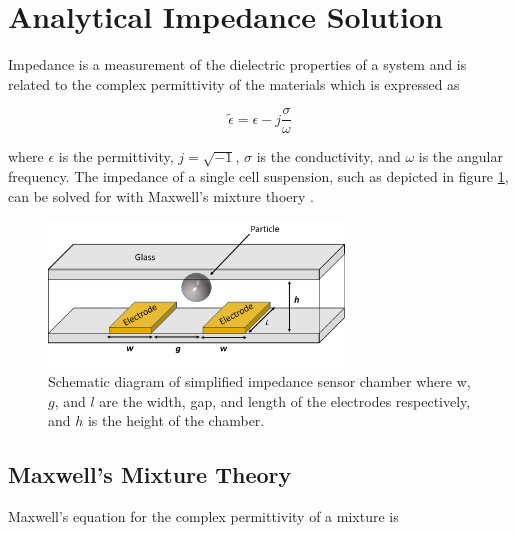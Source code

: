 
\section{Analytical Impedance Solution}

\par Impedance is a measurement of the dielectric properties of a system and is related to the complex permittivity of the materials which is expressed as

\begin{equation}
    \tilde{\epsilon} = \epsilon - j\frac{\sigma}{\omega}
\end{equation}

\noindent where $\epsilon$ is the permittivity, $j = \sqrt{-1}$, $\sigma$ is the conductivity, and $\omega$ is the angular frequency. The impedance of a single cell suspension, such as depicted in figure \ref{fig:simplified_IS}, can be solved for with Maxwell's mixture thoery \cite{james_clerk_maxwell_treatise_1892, sun_single-cell_2010}.

\begin{figure}[ht]
 \centering
 \includegraphics[width=0.7\textwidth]{images/cellAndElectrodes.png}
 \caption[Schematic diagram of simplified impedance sensor chamber.]{Schematic diagram of simplified impedance sensor chamber where w, $g$, and $l$ are the width, gap, and length of the electrodes respectively, and $h$ is the height of the chamber.}
 \label{fig:simplified_IS}
 \end{figure}
 
 

\subsection{Maxwell's Mixture Theory}
 
 Maxwell's equation for the complex permittivity of a mixture is
  
